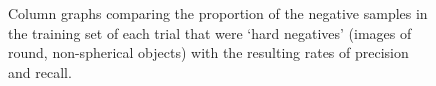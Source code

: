 \documentclass{sig-alternate-05-2015}
\begin{document}
{    \begin{figure}
      \centering
      \qquad
      \caption{Column graphs comparing the proportion of the negative samples in the training set of each trial that were `hard negatives' (images of round, non-spherical objects) with the resulting rates of precision and recall.}
      \label{fig:trial_comparison_charts}
    \end{figure}

}
\end{document}
